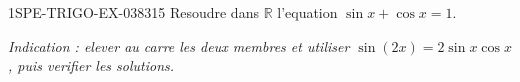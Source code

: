 \begin{exercice}{1SPE-TRIGO-EX-038}{3}{15}
Resoudre dans $\mathbb{R}$ l'equation $\sin x + \cos x = 1$.

\textit{Indication : elever au carre les deux membres et utiliser $\sin(2x) = 2\sin x \cos x$, puis verifier les solutions.}
\end{exercice}
